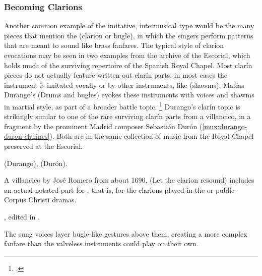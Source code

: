 \subsubsection{Becoming Clarions}

Another common example of the imitative, intermusical type would be the many
pieces that mention the  (clarion or bugle), in which the
singers perform patterns that are meant to sound like brass fanfares.
The typical style of clarion evocations may be seen in two examples from the
archive of the Escorial, which holds much of the surviving repertoire of the
Spanish Royal Chapel.
Most clarín pieces do not actually feature written-out clarín parts; in most
cases the instrument is imitated vocally or by other instruments, like
 (shawms).
Matías Durango's  (Drums and bugles) evokes these
instruments with voices and shawms in martial style, as part of a broader
battle topic.%
    \footnote{.}
Durango's clarín topic is strikingly similar to one of the rare surviving
clarín parts from a villancico, in a fragment by the prominent Madrid composer
Sebastián Durón (\cref{mux:durango-duron-clarines}). 
Both are in the same collection of music from the Royal Chapel preserved at the
Escorial.%
\begin{Footnote}
     (Durango),  (Durón).
\end{Footnote}
A villancico by José Romero from about 1690,  (Let the
clarion resound) includes an actual notated part for , that is, for the clarions played in the 
or public Corpus Christi dramas.%
\begin{Footnote} 
    , edited in \autocite[655--661]{CaberoPueyo:PhD}.
\end{Footnote}
The sung voices layer bugle-like gestures above them, creating a more complex
fanfare than the valveless instruments could play on their own.

\begin{musicexample}
    \label{mux:durango-duron-clarines}
    \caption{An imitation of  music by voice and shawm compared
    with an actual  part: 
    (1) Durango,  (, Tiple I-1,
    estribillo); 
    (2) Durón,  (, estribillo)}

\end{musicexample}

